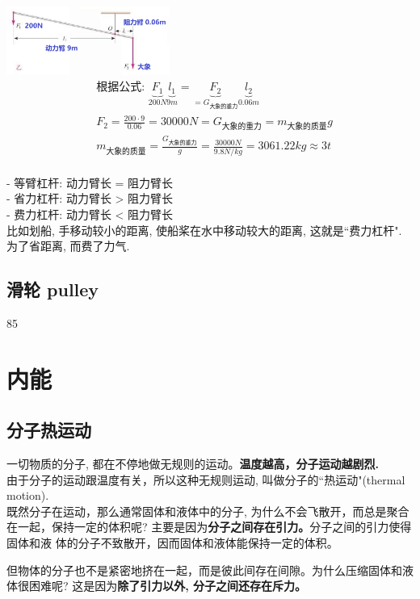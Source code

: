 \documentclass[UTF8]{ctexart}
\begin{document}
	
	
	\begin{tcolorbox}[title = {例},boxrule={0.1em},colframe={black!10}, colback={black!3},colbacktitle={black!10},coltitle={black}]
	\includegraphics[width=0.4\textwidth]{img/0049.png}	
	\begin{align*}
			& \text{根据公式:\ }\underset{200N}{\underbrace{F_1}}\underset{9m}{\underbrace{l_1}}=\underset{=G_{\text{大象的重力}}}{\underbrace{F_2}}\underset{0.06m}{\underbrace{l_2}}\\
		& F_2=\frac{200\cdot 9}{0.06}=30000N=G_{\text{大象的重力}}=m_{\text{大象的质量}}g\\
		& m_{\text{大象的质量}}=\frac{G_{\text{大象的重力}}}{g}=\frac{30000N}{9.8N/kg}=3061.22kg\approx 3t\\		
	\end{align*}
	\end{tcolorbox}
	
	
	- 等臂杠杆: 动力臂长 = 阻力臂长 \\
	- 省力杠杆: 动力臂长 > 阻力臂长 \\
	- 费力杠杆: 动力臂长 < 阻力臂长 \\
	比如划船, 手移动较小的距离, 使船桨在水中移动较大的距离, 这就是``费力杠杆". 为了省距离, 而费了力气.
	
	
	\vspace{1em} 
	
	
	\subsection{滑轮 pulley}
	
	85
	
	
	\section{内能}
	
	\subsection{分子热运动}
	
	一切物质的分子, 都在不停地做无规则的运动。\textbf{温度越高，分子运动越剧烈.} \\
	由于分子的运动跟温度有关，所以这种无规则运动, 叫做分子的``热运动"(thermal motion). \\
	
	既然分子在运动，那么通常固体和液体中的分子, 为什么不会飞散开，而总是聚合在一起，保持一定的体积呢? 主要是因为\textbf{分子之间存在引力。}分子之间的引力使得固体和液
	体的分子不致散开，因而固体和液体能保持一定的体积。
	
	但物体的分子也不是紧密地挤在一起，而是彼此间存在间隙。为什么压缩固体和液体很困难呢? 这是因为\textbf{除了引力以外, 分子之间还存在斥力。}
	
	
	
	
	
	
	
	
	
	
	
	
	
	
\end{document}
